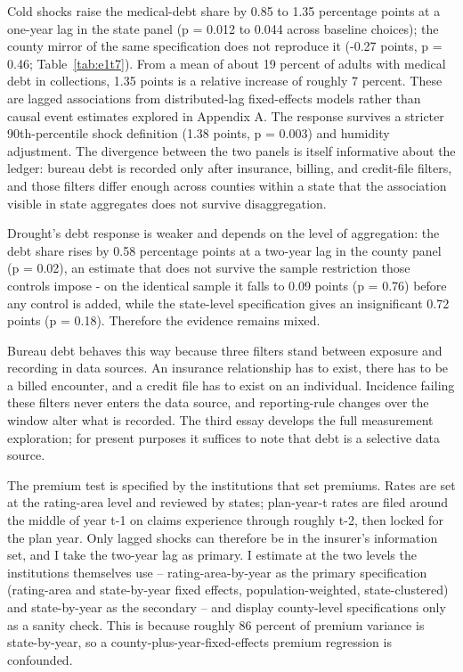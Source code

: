 \documentclass[a4paper,11pt]{article}
\begin{document}
Cold shocks raise the medical-debt share by 0.85 to 1.35 percentage points at a one-year lag in the state panel (p = 0.012 to 0.044 across baseline choices); the county mirror of the same specification does not reproduce it (-0.27 points, p = 0.46; Table~\ref{tab:e1t7}). From a mean of about 19 percent of adults with medical debt in collections, 1.35 points is a relative increase of roughly 7 percent. These are lagged associations from distributed-lag fixed-effects models rather than causal event estimates explored in Appendix A. The response survives a stricter 90th-percentile shock definition (1.38 points, p = 0.003) and humidity adjustment. The divergence between the two panels is itself informative about the ledger: bureau debt is recorded only after insurance, billing, and credit-file filters, and those filters differ enough across counties within a state that the association visible in state aggregates does not survive disaggregation.

Drought's debt response is weaker and depends on the level of aggregation: the debt share rises by 0.58 percentage points at a two-year lag in the county panel (p = 0.02), an estimate that does not survive the sample restriction those controls impose - on the identical sample it falls to 0.09 points (p = 0.76) before any control is added, while the state-level specification gives an insignificant 0.72 points (p = 0.18). Therefore the evidence remains mixed.

Bureau debt behaves this way because three filters stand between exposure and recording in data sources.  An insurance relationship has to exist, there has to be a billed encounter, and a credit file has to exist on an individual. Incidence failing these filters never enters the data source, and reporting-rule changes over the window alter what is recorded. The third essay develops the full measurement exploration; for present purposes it suffices to note that debt is a selective data source.

The premium test is specified by the institutions that set premiums. Rates are set at the rating-area level and reviewed by states; plan-year-t rates are filed around the middle of year t-1 on claims experience through roughly t-2, then locked for the plan year. Only lagged shocks can therefore be in the insurer's information set, and I take the two-year lag as primary. I estimate at the two levels the institutions themselves use -- rating-area-by-year as the primary specification (rating-area and state-by-year fixed effects, population-weighted, state-clustered) and state-by-year as the secondary -- and display county-level specifications only as a sanity check. This is because roughly 86 percent of premium variance is state-by-year, so a county-plus-year-fixed-effects premium regression is confounded.
\end{document}
